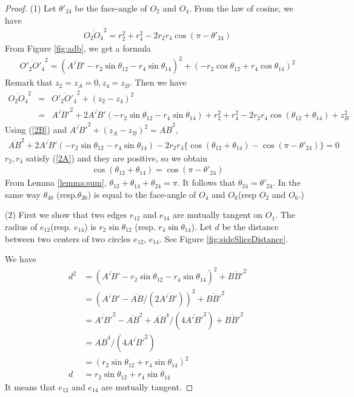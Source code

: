 \documentclass[suppldata, dvipdfmx]{interact}
\theoremstyle{plain}%
\theoremstyle{definition}
\theoremstyle{remark}
\theoremstyle{problemstyle}
\begin{document}
 
\begin{proof}
 (1) Let $\theta'_{24}$ be the face-angle of $O_2$ and $O_4$. From the
 law of cosine, we have
 \begin{align}
  \overline{O_2O_4}^2 = r_2^2 + r_4^2 - 2r_2r_4\cos(\pi-\theta'_{24}) \tag{2.B}\label{2B}
 \end{align}
From Figure \ref{fig:adb}, we get a formula
\begin{eqnarray*}
 \overline{O'_2O'_4}^2 = (\overline{A'B'} - r_2\sin\theta_{12}-
  r_4\sin\theta_{14})^2 + (-r_2\cos\theta_{12} + r_4 \cos \theta_{14})^2
\end{eqnarray*}
 Remark that $z_2 = z_A= 0, z_4 = z_B$. Then we have
\begin{eqnarray*}
 \overline{O_2O_4}^2 &=& \overline{O'_2O'_4}^2 + (z_2-z_4)^2\\
 &=&\overline{A'B'}^2 + 2 \overline{A'B'}(-r_2\sin\theta_{12} -
  r_4\sin\theta_{14}) + r^2_2 + r^2_4 -2r_2r_4\cos(\theta_{12} +
  \theta_{14}) + z^2_B
\end{eqnarray*}
Using (\ref{2B}) and $\overline{A'B'}^2 + (z_A-z_B)^2 = \overline{AB}^2$,
\begin{eqnarray*}
 \overline{AB}^2 + 2\overline{A'B'}(-r_2\sin\theta_{12} -
  r_4\sin\theta_{14}) - 2r_2r_4\{\cos(\theta_{12} + \theta_{14}) -
  \cos(\pi- \theta'_{24})\} = 0
\end{eqnarray*}
 $r_2, r_4$ satisfy (\ref{2A}) and they are positive, so we obtain
\begin{eqnarray*}
 \cos(\theta_{12} + \theta_{14}) = \cos(\pi - \theta'_{24})
\end{eqnarray*}
From Lemma \ref{lemma:sum}, $\theta_{12} + \theta_{14} + \theta_{24} = \pi$. It
 follows that $\theta_{24} = \theta'_{24}$. In the same way $\theta_{46}$
 (resp.$\theta_{26}$) is equal to the face-angle of $O_4$ and $O_6$(resp
 $O_2$ and $O_6$.)

(2) First we show that two edges $e_{12}$ and $e_{14}$ are mutually tangent
 on $O_1$. The radius of $e_{12}$(resp. $e_{14}$) is
 $r_2\sin\theta_{12}$ (resp. $r_4\sin\theta_{14}$). Let $d$ be the
 distance between two centers of two circles $e_{12}$, $e_{14}$. See
 Figure \ref{fig:sideSliceDistance}.

We have
 \begin{align*}
d^2&= (\overline{A'B'} - r_2\sin\theta_{12}-r_4\sin\theta_{14})^2 + \overline{BB'}^2\\
&= (\overline{A'B'} - \overline{AB}/(2\overline{A'B'}))^2 + \overline{BB'}^2\\
&= \overline{A'B'}^2 - \overline{AB}^2
  +\overline{AB}^4/(4\overline{A'B'}^2) + \overline{BB'}^2\\
&= \overline{AB}^4 / (4 \overline{A'B'}^2)\\
&=(r_2\sin\theta_{12} + r_4\sin\theta_{14})^2\\
d&= r_2\sin\theta_{12} + r_4\sin\theta_{14}
 \end{align*}
It means that $e_{12}$ and $e_{14}$ are mutually tangent.


\end{proof}
\end{document}
